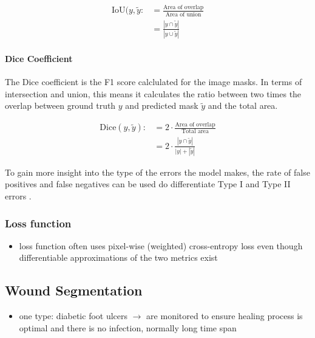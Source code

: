 \begin{align}
	\text{IoU}(y, \tilde{y} :&= \frac{\text{Area of overlap}}{\text{Area of union}}\\
	&=\frac{|y \cap \tilde{y}|}{|y \cup \tilde {y}|}
\end{align}


\paragraph{Dice Coefficient}

The Dice coefficient is the F1 score calclulated for the image masks. In terms of intersection and union, this means it calculates the ratio between two times the overlap between ground truth $y$ and predicted mask $\tilde{y}$ and the total area.

\begin{align}
	\text{Dice}(y, \tilde{y}) :&= 2 \cdot \frac{\text{Area of overlap}}{\text{Total area}}\\
	&= 2 \cdot \frac{|y \cap \tilde{y}|}{|y| + |\tilde{y}|}
\end{align}

To gain more insight into the type of the errors the model makes, the rate of false positives and false negatives can be used do differentiate Type I and Type II errors \cite{DFUC2022}.


\subsubsection{Loss function}

\begin{itemize}
	\item loss function often uses pixel-wise (weighted) cross-entropy loss even though differentiable approximations of the two metrics exist \cite{Eelbode}
\end{itemize}


\subsection{Wound Segmentation}

\begin{itemize}
	\item one type: diabetic foot ulcers $\rightarrow$ are monitored to ensure healing process is optimal and there is no infection, normally long time span \cite{DFUC2022}
\end{itemize}

